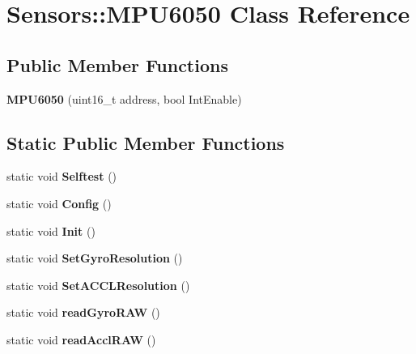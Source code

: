 \hypertarget{class_sensors_1_1_m_p_u6050}{}\section{Sensors\+::M\+P\+U6050 Class Reference}
\label{class_sensors_1_1_m_p_u6050}
\subsection*{Public Member Functions}
\begin{DoxyCompactItemize}
\item 
\mbox{\label{class_sensors_1_1_m_p_u6050_a4337504892ac68158e931db396394cb4}} 
{\bfseries M\+P\+U6050} (uint16\+\_\+t address, bool Int\+Enable)
\end{DoxyCompactItemize}
\subsection*{Static Public Member Functions}
\begin{DoxyCompactItemize}
\item 
\mbox{\label{class_sensors_1_1_m_p_u6050_ae486cc5f564bd74ad51a5cf6d891181a}} 
static void {\bfseries Selftest} ()
\item 
\mbox{\label{class_sensors_1_1_m_p_u6050_aff1ddd176379260467d6c9298ff4947e}} 
static void {\bfseries Config} ()
\item 
\mbox{\label{class_sensors_1_1_m_p_u6050_a99ea2843428bb6a5e1be7918f801c740}} 
static void {\bfseries Init} ()
\item 
\mbox{\label{class_sensors_1_1_m_p_u6050_a884ce6f3611872be1e2ae8edc2597148}} 
static void {\bfseries Set\+Gyro\+Resolution} ()
\item 
\mbox{\label{class_sensors_1_1_m_p_u6050_af55129df7e9ab209a493fd13769515b3}} 
static void {\bfseries Set\+A\+C\+C\+L\+Resolution} ()
\item 
\mbox{\label{class_sensors_1_1_m_p_u6050_a382126e687b83396014cbcbbc40d758c}} 
static void {\bfseries read\+Gyro\+R\+AW} ()
\item 
\mbox{\label{class_sensors_1_1_m_p_u6050_aa04bc07a49d6d7f187127c9fea171e8c}} 
static void {\bfseries read\+Accl\+R\+AW} ()
\end{DoxyCompactItemize}
